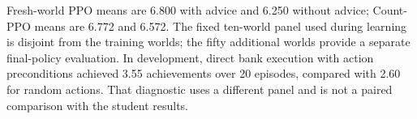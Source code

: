 Fresh-world PPO means are 6.800 with advice and 6.250 without advice;
Count-PPO means are 6.772 and 6.572. The fixed ten-world panel used
during learning is disjoint from the training worlds; the fifty
additional worlds provide a separate final-policy evaluation. In
development, direct bank execution with action preconditions achieved
3.55 achievements over 20 episodes, compared with 2.60 for random
actions. That diagnostic uses a different panel and is not a paired
comparison with the student results.

